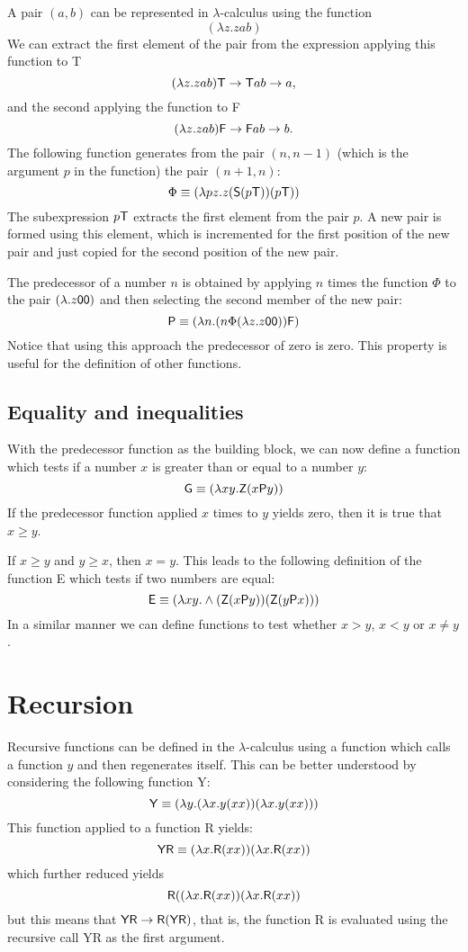 A pair $(a,b)$ can be represented in $\lambda$-calculus using the function
$$(\lambda z.zab)$$ We can extract the first element of the pair from the expression applying this function to {\sf T}
$$(\lambda z.zab){\sf T}\rightarrow {\sf T} ab\rightarrow a,$$ and the second applying the function to {\sf F}
$$(\lambda z.zab){\sf F} \rightarrow {\sf F} ab\rightarrow b.$$ 
The following function generates from the pair $(n,n-1)$ (which is the argument $p$ in the function) the pair $(n+1,n)$:
$$\Phi\equiv (\lambda pz.z({\sf S}(p{\sf T}))(p{\sf T}))$$
The subexpression $p{\sf T}$ extracts the first element from the pair $p$. A new pair is formed using this element, which is incremented for the first position of the new pair and just copied for the second position of the new pair.

The predecessor of a number $n$ is obtained by applying $n$ times the function $\Phi$ to the pair $(\lambda.z{\sf 00})$ and then selecting the second member of the new pair:
$${\sf P} \equiv (\lambda n.(n\Phi(\lambda z.z{\sf 00})){\sf F})$$
Notice that using this approach the predecessor of zero is zero. This property is useful for the definition of other functions.


\subsection{Equality and inequalities}
With the predecessor function as the building block, we can now define a function which tests if a number $x$ is greater than or equal to a number $y$:
\[{\sf G}\equiv (\lambda xy.{\sf Z} (x{\sf P}y))\]
If the predecessor function applied $x$ times to $y$ yields zero, then it is true that $x\geq y$. 

If $x\geq y$ and $y\geq x$, then $x=y$. This leads to the following definition of the function {\sf E} which tests if  two numbers are equal:
$${\sf E}\equiv(\lambda xy.\wedge({\sf Z}(x{\sf P}y))({\sf Z}(y{\sf P}x)))$$
In a similar manner we can define functions to test whether $x>y$, $x<y$ or $x\neq y$.



\section{Recursion}

Recursive functions can be defined in the $\lambda$-calculus using a function which calls a function $y$ and then regenerates itself. This can be better understood by considering the following function {\sf Y}:
\[{\sf Y}\equiv (\lambda y.(\lambda x.y(xx))(\lambda x.y(xx)))\]
This function applied to a function {\sf R} yields:
$${\sf YR}\equiv (\lambda x.{\sf R}(xx))(\lambda x.{\sf R}(xx))$$ which further reduced yields
$${\sf R}((\lambda x.{\sf R}(xx))(\lambda x.{\sf R}(xx))$$ 
but this means that ${\sf YR}\rightarrow{\sf R}({\sf YR})$, that is, the function {\sf R} is evaluated using the recursive call {\sf YR} as the first argument.

